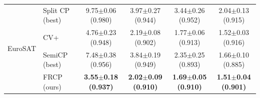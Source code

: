 \begin{table}[t]
\begin{tabular}{llcccc}
\midrule
\multirow{4}{*}{EuroSAT} & Split CP (best) & 9.75$\pm$0.06 {\scriptsize(0.980)} & 3.97$\pm$0.27 {\scriptsize(0.944)} & 3.44$\pm$0.26 {\scriptsize(0.952)} & 2.04$\pm$0.13 {\scriptsize(0.915)}\\
 & CV+ & 4.76$\pm$0.23 {\scriptsize(0.948)} & 2.19$\pm$0.08 {\scriptsize(0.902)} & 1.77$\pm$0.06 {\scriptsize(0.913)} & 1.52$\pm$0.03 {\scriptsize(0.916)}\\
 & SemiCP (best) & 7.48$\pm$0.38 {\scriptsize(0.956)} & 3.84$\pm$0.19 {\scriptsize(0.949)} & 2.35$\pm$0.25 {\scriptsize(0.893)} & 1.66$\pm$0.10 {\scriptsize(0.885)}\\
 & FRCP (ours) & \textbf{3.55$\pm$0.18 {\scriptsize(0.937)}} & \textbf{2.02$\pm$0.09 {\scriptsize(0.910)}} & \textbf{1.69$\pm$0.05 {\scriptsize(0.910)}} & \textbf{1.51$\pm$0.04 {\scriptsize(0.901)}}\\
\bottomrule
\end{tabular}
\end{table}
